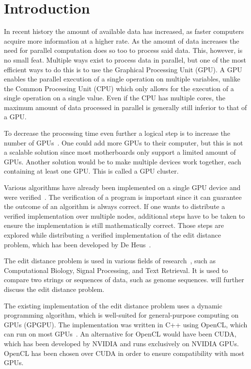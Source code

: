 \section{Introduction}
In recent history the amount of available data has increased, as faster computers acquire more information at a higher rate.
As the amount of data increases the need for parallel computation does so too to process said data.
This, however, is no small feat.
Multiple ways exist to process data in parallel, but one of the most efficient ways to do this is to use the Graphical Processing Unit (GPU).
A GPU enables the parallel execution of a single operation on multiple variables, unlike the Common Processing Unit (CPU) which only allows for the execution of a single operation on a single value.
Even if the CPU has multiple cores, the maximum amount of data processed in parallel is generally still inferior to that of a GPU.

To decrease the processing time even further a logical step is to increase the number of GPUs~\cite{Cluster}.
One could add more GPUs to their computer, but this is not a scalable solution since most motherboards only support a limited amount of GPUs.
Another solution would be to make multiple devices work together, each containing at least one GPU.
This is called a GPU cluster.

Various algorithms have already been implemented on a single GPU device and were verified~\cite{Heus}.
The verification of a program is important since it can guarantee the outcome of an algorithm is always correct.
If one wants to distribute a verified implementation over multiple nodes, additional steps have to be taken to ensure the implementation is still mathematically correct.
Those steps are explored while distributing a verified implementation of the edit distance problem, which has been developed by De Heus~\cite{Heus}.

The edit distance problem is used in various fields of research~\cite{Navarro:2001:GTA:375360.375365}, such as Computational Biology, Signal Processing, and Text Retrieval.
It is used to compare two strings or sequences of data, such as genome sequences.
 will further discuss the edit distance problem.

The existing implementation of the edit distance problem uses a dynamic programming algorithm, which is well-suited for general-purpose computing on GPUs (GPGPU).
The implementation was written in C++ using OpenCL, which can run on most GPUs~\cite{Kronos:conformant}.
An alternative for OpenCL would have been CUDA, which has been developed by NVIDIA and runs exclusively on NVIDIA GPUs.
OpenCL has been chosen over CUDA in order to ensure compatibility with most GPUs.

